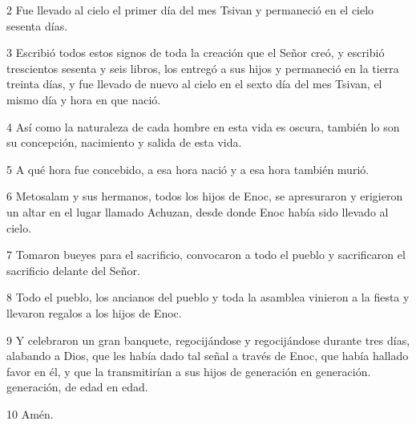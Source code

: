 \par 2 Fue llevado al cielo el primer día del mes Tsivan y permaneció en el cielo sesenta días.

\par 3 Escribió todos estos signos de toda la creación que el Señor creó, y escribió trescientos sesenta y seis libros, los entregó a sus hijos y permaneció en la tierra treinta días, y fue llevado de nuevo al cielo en el sexto día del mes Tsivan, el mismo día y hora en que nació.

\par 4 Así como la naturaleza de cada hombre en esta vida es oscura, también lo son su concepción, nacimiento y salida de esta vida.

\par 5 A qué hora fue concebido, a esa hora nació y a esa hora también murió.

\par 6 Metosalam y sus hermanos, todos los hijos de Enoc, se apresuraron y erigieron un altar en el lugar llamado Achuzan, desde donde Enoc había sido llevado al cielo.

\par 7 Tomaron bueyes para el sacrificio, convocaron a todo el pueblo y sacrificaron el sacrificio delante del Señor.

\par 8 Todo el pueblo, los ancianos del pueblo y toda la asamblea vinieron a la fiesta y llevaron regalos a los hijos de Enoc.

\par 9 Y celebraron un gran banquete, regocijándose y regocijándose durante tres días, alabando a Dios, que les había dado tal señal a través de Enoc, que había hallado favor en él, y que la transmitirían a sus hijos de generación en generación. generación, de edad en edad.

\par 10 Amén.



